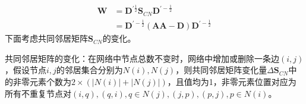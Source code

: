 \begin{equation}\label{defin:delta_w}
\begin{aligned}
\textbf{W} &= \textbf{D}^{\prime\frac{1}{2}}\textbf{S}_{CN}\textbf{D}^{\prime-\frac{1}{2}} \\
&=\textbf{D}^{\prime-\frac{1}{2}}(\textbf{A}\textbf{A}-\textbf{D})\textbf{D}^{\prime-\frac{1}{2}}
\end{aligned}
\end{equation}
下面考虑共同邻居矩阵$\textbf{S}_{CN}$的变化。
\begin{lemma}
	{共同邻居矩阵的变化}：在网络中节点总数不变时，网络中增加或删除一条边$(i,j)$，假设节点$i,j$的邻居集合分别为$N(i), N(j)$，则共同邻居矩阵变化量$\Delta\textbf{S}_{CN}$中的非零元素个数为$2\times(|N(i)| + |N(j)|)$，且值均为1，非零元素位置对应为所有不重复节点对$(i,q),(q,i), q\in N(j), (j,p),(p,j) ,p\in N(i)$。
\end{lemma}


